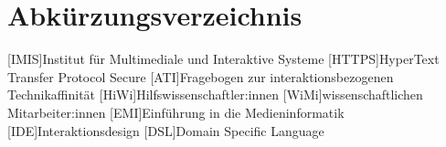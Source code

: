 
\cleardoublepage
{}
\chapter*{Abkürzungsverzeichnis}
\label{section-abbrevs}

\begin{acronym}[Companion]
  [IMIS]{Institut für Multimediale und Interaktive Systeme}
  [HTTPS]{HyperText Transfer Protocol Secure}
  [ATI]{Fragebogen zur interaktionsbezogenen Technikaffinität}
  [HiWi]{Hilfswissenschaftler:innen}
  [WiMi]{wissenschaftlichen Mitarbeiter:innen}
  [EMI]{Einführung in die Medieninformatik}
  [IDE]{Interaktionsdesign}
  [DSL]{Domain Specific Language} 
\end{acronym}
